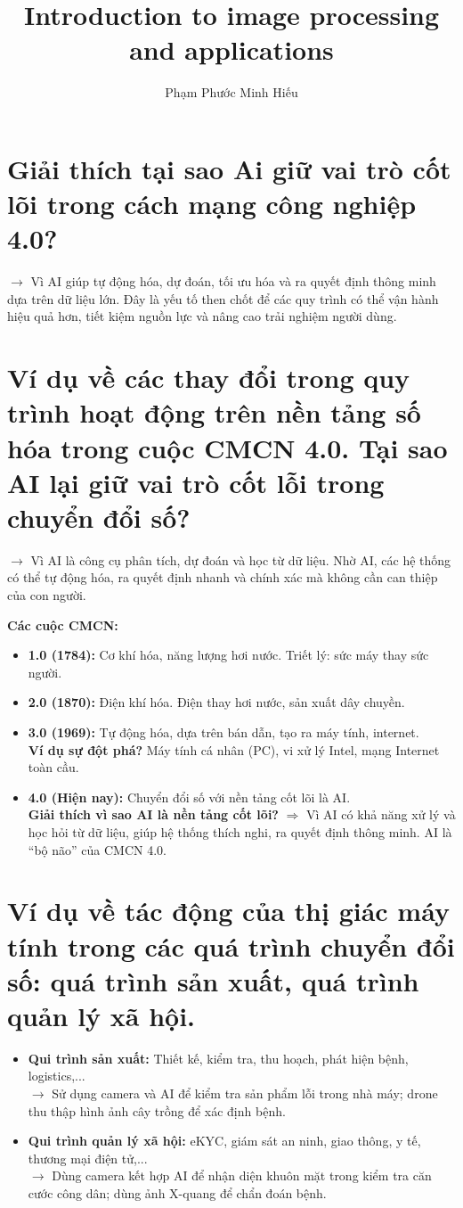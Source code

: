\documentclass[12pt]{article}
\title{Introduction to image processing and applications}
\author{Phạm Phước Minh Hiếu}
\begin{document}
	\section{Giải thích tại sao Ai giữ vai trò cốt lõi trong cách mạng công nghiệp 4.0?}
	
	$\rightarrow$ Vì AI giúp tự động hóa, dự đoán, tối ưu hóa và ra quyết định thông minh dựa trên dữ liệu lớn. Đây là yếu tố then chốt để các quy trình có thể vận hành hiệu quả hơn, tiết kiệm nguồn lực và nâng cao trải nghiệm người dùng.
	
	\section{Ví dụ về các thay đổi trong quy trình hoạt động trên nền tảng số hóa trong cuộc CMCN 4.0. Tại sao AI lại giữ vai trò cốt lỗi trong chuyển đổi số?}
	
	$\rightarrow$ Vì AI là công cụ phân tích, dự đoán và học từ dữ liệu. Nhờ AI, các hệ thống có thể tự động hóa, ra quyết định nhanh và chính xác mà không cần can thiệp của con người.
	
	\textbf{Các cuộc CMCN:}
	\begin{itemize}
	\item \textbf{1.0 (1784):} Cơ khí hóa, năng lượng hơi nước. Triết lý: sức máy thay sức người.
	\item \textbf{2.0 (1870):} Điện khí hóa. Điện thay hơi nước, sản xuất dây chuyền.
	\item \textbf{3.0 (1969):} Tự động hóa, dựa trên bán dẫn, tạo ra máy tính, internet.\\
	\textbf{Ví dụ sự đột phá?} Máy tính cá nhân (PC), vi xử lý Intel, mạng Internet toàn cầu.
	\item \textbf{4.0 (Hiện nay):} Chuyển đổi số với nền tảng cốt lõi là AI.\\
	\textbf{Giải thích vì sao AI là nền tảng cốt lõi?} $\Rightarrow$ Vì AI có khả năng xử lý và học hỏi từ dữ liệu, giúp hệ thống thích nghi, ra quyết định thông minh. AI là “bộ não” của CMCN 4.0.
	\end{itemize}
	
	\section{Ví dụ về tác động của thị giác máy tính trong các quá trình chuyển đổi số: quá trình sản xuất, quá trình quản lý xã hội. }
	
	\begin{itemize}
	\item \textbf{Qui trình sản xuất:} Thiết kế, kiểm tra, thu hoạch, phát hiện bệnh, logistics,...\\
	$\rightarrow$ Sử dụng camera và AI để kiểm tra sản phẩm lỗi trong nhà máy; drone thu thập hình ảnh cây trồng để xác định bệnh.
	
	\item \textbf{Qui trình quản lý xã hội:} eKYC, giám sát an ninh, giao thông, y tế, thương mại điện tử,...\\
	$\rightarrow$ Dùng camera kết hợp AI để nhận diện khuôn mặt trong kiểm tra căn cước công dân; dùng ảnh X-quang để chẩn đoán bệnh.
	\end{itemize}
	
\end{document}

